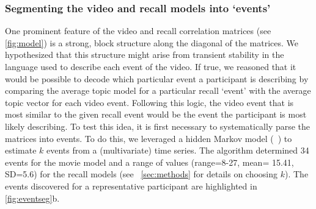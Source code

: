 \documentclass{article}
\begin{document}
{%

\subsubsection{Segmenting the video and recall models into `events'}
One prominent feature of the video and recall correlation matrices (see \ref{fig:model}) is a strong, block structure along the diagonal of the matrices.  We hypothesized that this structure might arise from transient stability in the language used to describe each event of the video. If true, we reasoned that it would be possible to decode which particular event a participant is describing by comparing the average topic model for a particular recall `event' with the average topic vector for each video event. Following this logic, the video event that is most similar to the given recall event would be the event the participant is most likely describing.  To test this idea, it is first necessary to systematically parse the matrices into events.  To do this, we leveraged a hidden Markov model (~\citep{BaldEtal17}) to estimate $k$ events from a (multivariate) time series. The algorithm determined 34 events for the movie model and a range of values (range=8-27, mean= 15.41, SD=5.6) for the recall models (see ~\ref{sec:methods} for details on choosing $k$).  The events discovered for a representative participant are highlighted in \ref{fig:eventseg}b.

}
\end{document}
